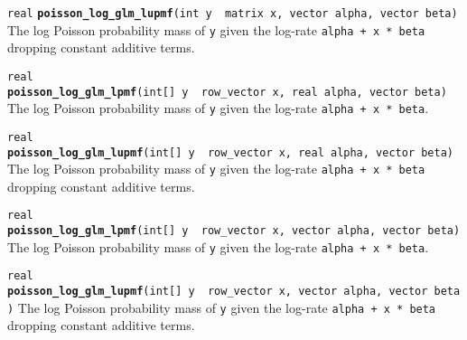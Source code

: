 \documentclass[
  10pt,
]{book}
\begin{document}

\texttt{real} \textbf{\texttt{poisson\_log\_glm\_lupmf}}\texttt{(int\ y\ \textbar{}\ matrix\ x,\ vector\ alpha,\ vector\ beta)}\newline
The log Poisson probability mass of \texttt{y} given the log-rate \texttt{alpha\ +\ x\ *\ beta}
dropping constant additive terms.


\texttt{real} \textbf{\texttt{poisson\_log\_glm\_lpmf}}\texttt{(int{[}{]}\ y\ \textbar{}\ row\_vector\ x,\ real\ alpha,\ vector\ beta)}\newline
The log Poisson probability mass of \texttt{y} given the log-rate \texttt{alpha\ +\ x\ *\ beta}.


\texttt{real} \textbf{\texttt{poisson\_log\_glm\_lupmf}}\texttt{(int{[}{]}\ y\ \textbar{}\ row\_vector\ x,\ real\ alpha,\ vector\ beta)}\newline
The log Poisson probability mass of \texttt{y} given the log-rate \texttt{alpha\ +\ x\ *\ beta}
dropping constant additive terms.


\texttt{real} \textbf{\texttt{poisson\_log\_glm\_lpmf}}\texttt{(int{[}{]}\ y\ \textbar{}\ row\_vector\ x,\ vector\ alpha,\ vector\ beta)}\newline
The log Poisson probability mass of \texttt{y} given the log-rate \texttt{alpha\ +\ x\ *\ beta}.


\texttt{real} \textbf{\texttt{poisson\_log\_glm\_lupmf}}\texttt{(int{[}{]}\ y\ \textbar{}\ row\_vector\ x,\ vector\ alpha,\ vector\ beta)}\newline
The log Poisson probability mass of \texttt{y} given the log-rate \texttt{alpha\ +\ x\ *\ beta}
dropping constant additive terms.

\end{document}
